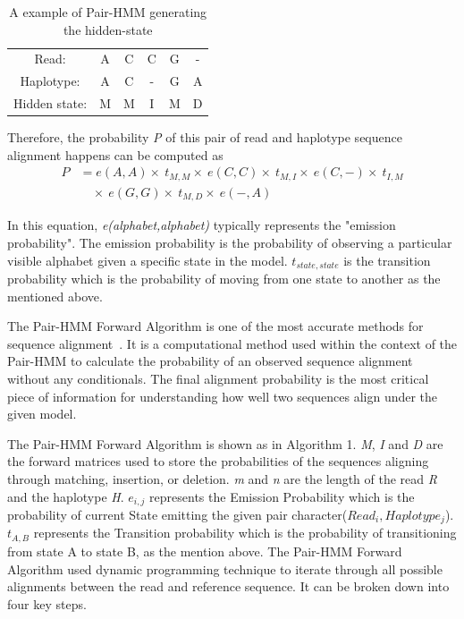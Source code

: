 \documentclass[PhD]{PHlab-thesis}
\begin{document}
\begin{table}[h]
    \centering
    \begin{tabular}{cccccc}
    \multicolumn{1}{c}{Read:} & A & C & C & G & - \\
    \multicolumn{1}{c}{Haplotype:} & A & C & - & G & A \\
    \multicolumn{1}{c}{Hidden state:} & M & M & I & M & D \\
    \end{tabular}
    \caption{A example of Pair-HMM generating the hidden-state}
    \label{tab:hidden state}
\end{table}
Therefore, the probability \textit{P} of this pair of read and haplotype sequence alignment happens can be computed as 
\begin{align*}
P &= e(A,A) \times\ t_{M,M} \times\ e(C,C) \times\ t_{M,I} \times\ e(C,-) \times\ t_{I,M} \\
  &\quad\times\ e(G,G) \times\ t_{M,D} \times\ e(-,A)
\end{align*}

In this equation, \textit{e(alphabet,alphabet)} typically represents the "emission probability". The emission probability is the probability of observing a particular visible alphabet given a specific state in the model. \textit{$t_{state,state}$} is the transition probability which is the probability of moving from one state to another as the mentioned above.

The Pair-HMM Forward Algorithm is one of the most accurate methods for sequence alignment~\cite{Shanshan1,EnliangLi1}. It is a computational method used within the context of the Pair-HMM to calculate the probability of an observed sequence alignment without any conditionals. The final alignment probability is the most critical piece of information for understanding how well two sequences align under the given model.

The Pair-HMM Forward Algorithm is shown as in Algorithm 1. \textit{M}, \textit{I} and \textit{D} are the forward matrices used to store the probabilities of the sequences aligning through matching, insertion, or deletion. \textit{m} and \textit{n} are the length of the read \textit{R} and the haplotype \textit{H}. $e_{i,j}$ represents the Emission Probability which is the probability of current State emitting the given pair character($Read_{i},Haplotype_{j}$).  $t_{A,B}$ represents the Transition probability which is the probability of transitioning from state A to state B, as the mention above.
The Pair-HMM Forward Algorithm used dynamic programming technique to iterate through all possible alignments between the read and reference sequence. It can be broken down into four key steps.
\end{document}

